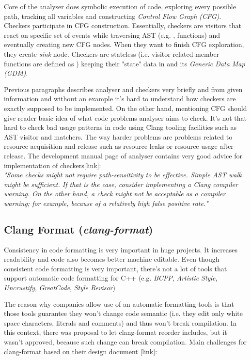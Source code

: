 Core of the analyser does symbolic execution of code, exploring every possible path, tracking all variables and constructing \emph{Control Flow Graph (CFG)}. Checkers participate in CFG construction. Essentially, checkers are visitors that react on specific set of events while traversing AST (e.g. ,  functions) and eventually creating new CFG nodes. When they want to finish CFG exploration, they create \emph{sink} node. Checkers are stateless (i.e. visitor related member functions are defined as ) keeping their "state" data in  and its \emph{Generic Data Map (GDM)}.

Previous paragraphs describes analyser and checkers very briefly and from given information and without an example it's hard to understand how checkers are exactly supposed to be implemented. On the other hand, mentioning CFG should give reader basic idea of what code problems analyser aims to check. It's not that hard to check bad usage patterns in code using Clang tooling facilities such as AST visitor and matchers. The way harder problems are problems related to resource acquisition and release such as resource leaks or resource usage after release. The development manual page of analyser contains very good advice for implementation of checkers[link]:\\

\label{clang-analyzer-checkers}
\emph{"Some checks might not require path-sensitivity to be effective. Simple AST walk might be sufficient. If that is the case, consider implementing a Clang compiler warning. On the other hand, a check might not be acceptable as a compiler warning; for example, because of a relatively high false positive rate."}

\subsection{Clang Format (\emph{clang-format})}
\label{clang-format}
Consistency in code formatting is very important in huge projects. It increases readability and code also becomes better machine editable. Even though consistent code formatting is very important, there's not a lot of tools that support automatic code formatting for C++ (e.g. \textit{BCPP}, \textit{Artistic Style}, \textit{Uncrustify}, \textit{GreatCode}, \emph{Style Revisor})

The reason why companies allow use of an automatic formatting tools is that those tools guarantee they won't change code semantic (i.e. they edit only white space characters, literals and comments) and thus won't break compilation. In this context, there was proposal to let clang-format reorder includes, but it wasn't approved, because such change can break compilation. Main challenges for clang-format based on their design document [link]:

